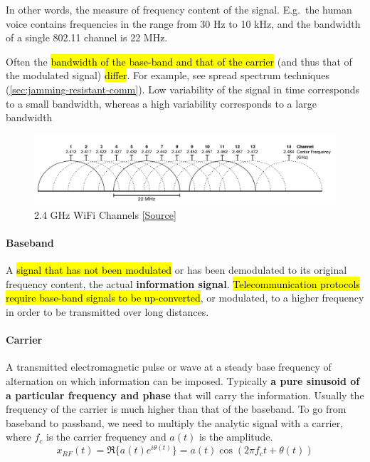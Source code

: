 In other words, the measure of frequency content of the signal. E.g.\ the human
voice contains frequencies in the range from 30 Hz to 10 kHz, and the bandwidth
of a single 802.11 channel is 22 MHz.

Often the \hl{bandwidth of the base-band and that of the carrier} (and
thus that of the modulated signal) \hl{differ}. For example, see spread spectrum techniques
(\autoref{sec:jamming-resistant-comm}). Low variability of the signal in time
corresponds to a small bandwidth, whereas a high variability corresponds to a
large bandwidth

\begin{figure}[h]
	\centering
	\includegraphics[scale=0.35]{images/1-wifi-channels.png}
	\caption{2.4 GHz WiFi Channels \href{https://en.wikipedia.org/wiki/List\_of\_WLAN\_channels\#/media/File:2.4\_GHz\_Wi-Fi\_channels\_(802.11b,g_WLAN).svg}{[Source]}}%
	\label{fig:wifi-channels}
\end{figure}

\paragraph{Baseband}
A \hl{signal that has not been modulated} or has been
demodulated to its original frequency content, the actual \textbf{information
	signal}. \hl{Telecommunication protocols require base-band signals to be
	up-converted}, or modulated, to a higher frequency in order to be transmitted over
long distances.

\paragraph{Carrier}
A transmitted electromagnetic pulse or wave at a steady base frequency of
alternation on which information can be imposed. Typically \textbf{a pure
	sinusoid of a particular frequency and phase} that will carry the information.
Usually the frequency of the carrier is much higher than that of the baseband.
To go from baseband to passband, we need to multiply the analytic signal with a
carrier, where $f_c$ is the carrier frequency and $a(t)$ is the amplitude.
\[ x_{RF} (t) = \Re \{a(t)e^{i\theta (t)}\} = a(t) \cos (2 \pi f_c t + \theta(t))\]


